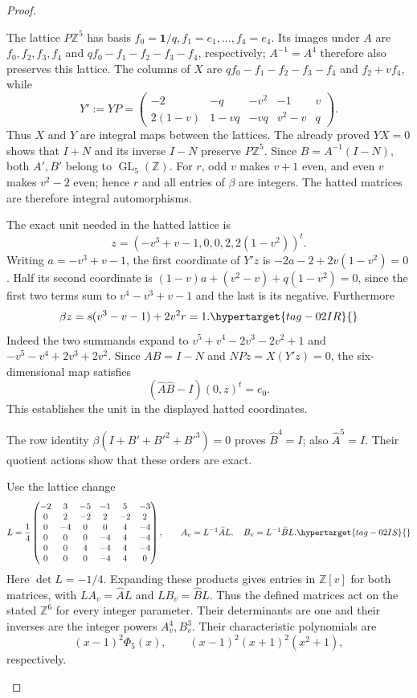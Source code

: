 \documentclass[11pt,a4paper]{article}
\numberwithin{equation}{section}
\theoremstyle{definition}
\begin{document}
\begin{proof}
\begin{enumerate}[label=\arabic*.]
The lattice $P\mathbb Z^5$ has basis
$f_0=\mathbf1/q,f_1=e_1,\ldots,f_4=e_4$.
Its images under $A$ are $f_0,f_2,f_3,f_4$ and
$qf_0-f_1-f_2-f_3-f_4$, respectively; $A^{-1}=A^4$
therefore also preserves this lattice. The columns of $X$ are
$qf_0-f_1-f_2-f_3-f_4$ and $f_2+vf_4$, while
\[
 Y':=YP=\begin{pmatrix}
 -2&-q&-v^2&-1&v\\
 2(1-v)&1-vq&-vq&v^2-v&q
 \end{pmatrix}.
\]
Thus $X$ and $Y$ are integral maps between the lattices.
The already proved $YX=0$ shows that $I+N$ and its inverse $I-N$
preserve $P\mathbb Z^5$. Since $B=A^{-1}(I-N)$, both
$A',B'$ belong to $\operatorname{GL}_5(\mathbb Z)$.
For $r$, odd $v$ makes $v+1$ even, and even $v$ makes
$v^2-2$ even; hence $r$ and all entries of $\beta$ are integers.
The hatted matrices are therefore integral automorphisms.

The exact unit needed in the hatted lattice is
\[
 z=(-v^3+v-1,0,0,2,2(1-v^2))^t.
\]
Writing $a=-v^3+v-1$, the first coordinate of $Y'z$ is
$-2a-2+2v(1-v^2)=0$. Half its second coordinate is
$(1-v)a+(v^2-v)+q(1-v^2)=0$, since the first two terms
sum to $v^4-v^3+v-1$ and the last is its negative. Furthermore
\begin{equation}
 \beta z=s(v^3-v-1)+2v^2r=1.
 \hypertarget{tag-02IR}{}\label{maps:eq:F.U5}
\end{equation}
Indeed the two summands expand to
$v^5+v^4-2v^3-2v^2+1$ and
$-v^5-v^4+2v^3+2v^2$.
Since $AB=I-N$ and $NPz=X(Y'z)=0$, the six-dimensional
map satisfies
\[
 (\widehat A\widehat B-I)(0,z)^t=e_0.
\]
This establishes the unit in the displayed hatted coordinates.

The row identity
$\beta(I+B'+B'^2+B'^3)=0$ proves
$\widehat B^4=I$; also $\widehat A^5=I$. Their quotient actions
show that these orders are exact.

Use the lattice change
\begin{equation}
 L=\frac14\begin{pmatrix}
 -2&3&-5&-1&5&-3\\
 0&2&-2&2&-2&2\\
 0&-4&0&0&4&-4\\
 0&0&0&-4&4&-4\\
 0&0&4&-4&4&-4\\
 0&0&0&-4&4&0
 \end{pmatrix},\qquad
 A_v=L^{-1}\widehat A L,\quad B_v=L^{-1}\widehat B L.
 \hypertarget{tag-02IS}{}\label{maps:eq:F.U6}
\end{equation}
Here $\det L=-1/4$. Expanding these products gives entries in
$\mathbb Z[v]$ for both matrices, with
$LA_v=\widehat A L$ and $LB_v=\widehat B L$. Thus the
defined matrices act on the stated $\mathbb Z^6$ for every integer
parameter. Their determinants are one and their inverses are
the integer powers $A_v^4,B_v^3$. Their characteristic polynomials are
\[
 (x-1)^2\Phi_5(x),\qquad (x-1)^2(x+1)^2(x^2+1),
\]
respectively.


\end{enumerate}
\end{proof}
\end{document}

